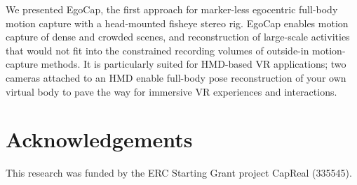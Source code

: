 \documentclass[runningheads]{llncs}
\newcommand{\NEW}[1]{#1}
\begin{document}
We presented EgoCap, the first approach for marker-less egocentric full-body motion capture with a head-mounted fisheye stereo rig. 
%
EgoCap enables motion capture of dense and crowded scenes, and reconstruction of large-scale activities that would not fit into the constrained recording volumes of outside-in motion-capture methods.
%
%
%
It is particularly suited for HMD-based VR applications; two cameras attached to an HMD enable full-body pose reconstruction of your own virtual body \NEW{to pave the way for immersive VR experiences and interactions}.


\section*{Acknowledgements}

This research was funded by the ERC Starting Grant project CapReal (335545).



\end{document}
